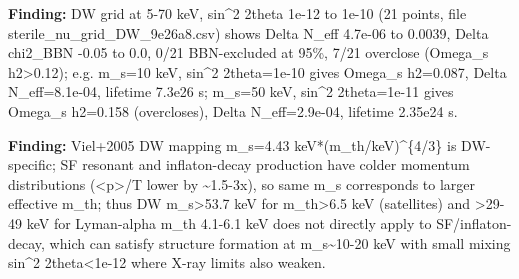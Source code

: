 \documentclass[11pt,a4paper]{article}
\begin{document}
\textbf{Finding:} DW grid at 5-70 keV, sin\textasciicircum{}2 2theta 1e-12 to 1e-10 (21 points, file sterile\_nu\_grid\_DW\_9e26a8.csv) shows Delta N\_eff 4.7e-06 to 0.0039, Delta chi2\_BBN -0.05 to 0.0, 0/21 BBN-excluded at 95\%, 7/21 overclose (Omega\_s h2\textgreater{}0.12); e.g. m\_s=10 keV, sin\textasciicircum{}2 2theta=1e-10 gives Omega\_s h2=0.087, Delta N\_eff=8.1e-04, lifetime 7.3e26 s; m\_s=50 keV, sin\textasciicircum{}2 2theta=1e-11 gives Omega\_s h2=0.158 (overcloses), Delta N\_eff=2.9e-04, lifetime 2.35e24 s.

\textbf{Finding:} Viel+2005 DW mapping m\_s=4.43 keV*(m\_th/keV)\textasciicircum{}\{4/3\} is DW-specific; SF resonant and inflaton-decay production have colder momentum distributions (\textless{}p\textgreater{}/T lower by \textasciitilde{}1.5-3x), so same m\_s corresponds to larger effective m\_th; thus DW m\_s\textgreater{}53.7 keV for m\_th\textgreater{}6.5 keV (satellites) and \textgreater{}29-49 keV for Lyman-alpha m\_th 4.1-6.1 keV does not directly apply to SF/inflaton-decay, which can satisfy structure formation at m\_s\textasciitilde{}10-20 keV with small mixing sin\textasciicircum{}2 2theta\textless{}1e-12 where X-ray limits also weaken.
\end{document}
